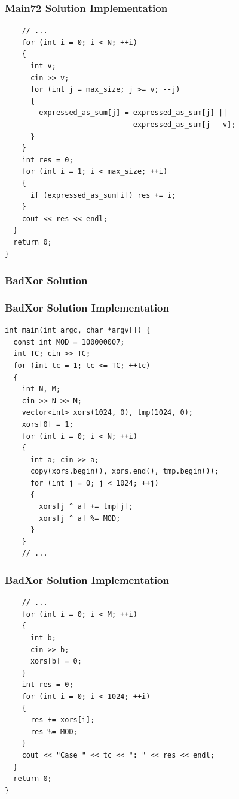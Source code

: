 \documentclass{beamer}
\begin{document}
\begin{frame}[containsverbatim]
\frametitle{Main72 Solution Implementation}
\scriptsize

\begin{lstlisting}
    // ...
    for (int i = 0; i < N; ++i)
    {
      int v;
      cin >> v;
      for (int j = max_size; j >= v; --j)
      {
        expressed_as_sum[j] = expressed_as_sum[j] ||
                              expressed_as_sum[j - v];
      }
    }
    int res = 0;
    for (int i = 1; i < max_size; ++i)
    {
      if (expressed_as_sum[i]) res += i;
    }
    cout << res << endl;
  }
  return 0;
}
\end{lstlisting}

\end{frame}

\begin{frame}%
\frametitle{BadXor Solution}

\end{frame}

\begin{frame}[containsverbatim]
\frametitle{BadXor Solution Implementation}
\scriptsize

\begin{lstlisting}
int main(int argc, char *argv[]) {
  const int MOD = 100000007;
  int TC; cin >> TC;
  for (int tc = 1; tc <= TC; ++tc)
  {
    int N, M;
    cin >> N >> M;
    vector<int> xors(1024, 0), tmp(1024, 0);
    xors[0] = 1;
    for (int i = 0; i < N; ++i)
    {
      int a; cin >> a;
      copy(xors.begin(), xors.end(), tmp.begin());
      for (int j = 0; j < 1024; ++j)
      {
        xors[j ^ a] += tmp[j];
        xors[j ^ a] %= MOD;
      }
    }
    // ...
\end{lstlisting}

\end{frame}

\begin{frame}[containsverbatim]
\frametitle{BadXor Solution Implementation}
\scriptsize

\begin{lstlisting}
    // ...
    for (int i = 0; i < M; ++i)
    {
      int b;
      cin >> b;
      xors[b] = 0;
    }
    int res = 0;
    for (int i = 0; i < 1024; ++i)
    {
      res += xors[i];
      res %= MOD;
    }
    cout << "Case " << tc << ": " << res << endl;
  }
  return 0;
}
\end{lstlisting}

\end{frame}
\end{document}
